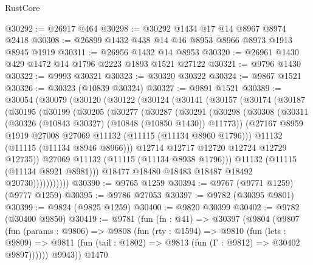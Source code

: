 \begin{lexlean}{RustCore}
\begin{coremodule}
@30292 := @26917 @464
@30298 := @30292 @1434 @17 @14 @8967 @8974 @2418
@30308 := @26899 @1432 @438 @14 @16 @8953 @8966 @8973 @1913 @8945 @1919
@30311 := @26956 @1432 @14 @8953
@30320 := @26961 @1430 @429 @1472 @14 @1796 @2223 @1893 @1521 @27122
@30321 := @9796 @1430
@30322 := @9993 @30321
@30323 := @30320 @30322
@30324 := @9867 @1521
@30326 := @30323 (@10839 @30324)
@30327 := @9891 @1521
@30389 := @30054
    (@30079
      (@30120
        (@30122
          (@30124
            (@30141
              (@30157
                (@30174
                  (@30187
                    (@30195
                      (@30199
                        (@30205
                          (@30277
                            (@30287
                              (@30291
                                (@30298
                                  (@30308
                                    (@30311 (@30326 (@10843 @30327) (@10848 (@10850 @1430)) @11773))
                                    (@27167
                                      @8959
                                      @1919
                                      @27008
                                      @27069
                                      @11132
                                      (@11115 (@11134 @8960 @1796)))
                                    @11132
                                    (@11115 (@11134 @8946 @8966)))
                                  @12714
                                  @12717
                                  @12720
                                  @12724
                                  @12729
                                  @12735))
                              @27069
                              @11132
                              (@11115 (@11134 @8938 @1796)))
                            @11132
                            (@11115 (@11134 @8921 @8981)))
                          @18477
                          @18480
                          @18483
                          @18487
                          @18492
                          @20730)))))))))))
@30390 := @9765 @1259
@30394 := @9767 (@9771 @1259) (@9777 @1259)
@30395 := @9786 @27053
@30397 := @9782 (@30395 @9801)
@30399 := @9824 (@9825 @1259)
@30400 := @9820 @30399
@30402 := @9782 (@30400 @9850)
@30419 := @9781
    (fun (fn : @41) =>
    @30397
      (@9804
        (@9807
          (fun (params : @9806) =>
          @9808
            (fun (rty : @1594) =>
            @9810
              (fun (lets : @9809) =>
              @9811 (fun (tail : @1802) => @9813 (fun (Γ : @9812) => @30402 @9897))))))
        @9943))
    @1470

\end{coremodule}
\end{lexlean}
